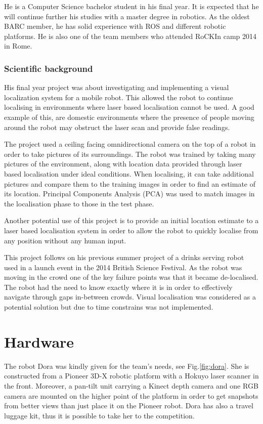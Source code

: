 \documentclass[conference]{IEEEtran}
\begin{document}
He is a Computer Science bachelor student in his final year. It is expected that he will continue further his studies with a master degree in robotics. As the oldest BARC member, he has solid experience with ROS and different robotic platforms. He is also one of the team members who attended RoCKIn camp 2014 in Rome.

\subsubsection*{Scientific background}
 
His final year project was about investigating and implementing a visual localization system for a mobile robot. This allowed the robot to continue localising in environments where laser based localisation cannot be used. A good example of this, are domestic environments where the presence of people moving around the robot may obstruct the laser scan and provide false readings.
 
The project used a ceiling facing omnidirectional camera on the top of a robot in order to take pictures of its surroundings.
The robot was trained by taking many pictures of the environment, along with location data provided through laser based localisation under ideal conditions. When localising, it can take additional pictures and compare them to the training images in order to find an estimate of its location. Principal Components Analysis (PCA) was used to match images in the localisation phase to those in the test phase. 

Another potential use of this project is to provide an initial location estimate to a laser based localisation system in order to allow the robot to quickly localise from any position without any human input.

This project follows on his previous summer project of a drinks serving robot used in a launch event in the 2014 British Science Festival. As the robot was moving in the crowd one of the key failure points was that it became de-localised. The robot had the need to know exactly where it is in order to effectively navigate through gaps in-between crowds. Visual localisation was considered as a potential solution but due to time constrains was not implemented.

\section{\label{sec:hardware}Hardware}
The robot Dora was kindly given for the team's needs, see Fig.\ref{fig:dora}. She is constructed from a Pioneer 3D-X robotic platform with a Hokuyo laser scanner in the front. Moreover, a pan-tilt unit carrying a Kinect depth camera and one RGB camera
are mounted on the higher point of the platform in order to get snapshots from better views than just place it on the Pioneer robot. Dora has also a travel luggage kit, thus it is possible to take her to the competition.
\end{document}
